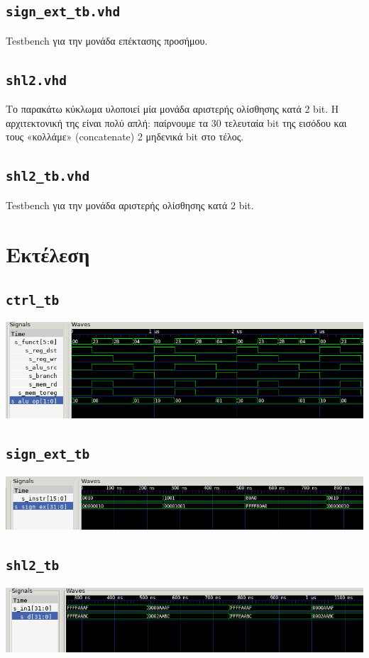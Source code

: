 \documentclass{article}
\begin{document}
\subsection{\lstinline{sign_ext_tb.vhd}}

Testbench για την μονάδα επέκτασης προσήμου. \\


\pagebreak

\subsection{\lstinline{shl2.vhd}}

Το παρακάτω κύκλωμα υλοποιεί μία μονάδα αριστερής ολίσθησης κατά 2 bit. Η
αρχιτεκτονική της είναι πολύ απλή: παίρνουμε τα 30 τελευταία bit της εισόδου
και τους «κολλάμε» (concatenate) 2 μηδενικά bit στο τέλος. \\


\pagebreak

\subsection{\lstinline{shl2_tb.vhd}}

Testbench για την μονάδα αριστερής ολίσθησης κατά 2 bit. \\


\pagebreak

\section{Εκτέλεση}

\subsection{\lstinline{ctrl_tb}}
\includegraphics[width=\textwidth]{res/ctrl.png}

\subsection{\lstinline{sign_ext_tb}}
\includegraphics[width=\textwidth]{res/sign_ext.png}

\subsection{\lstinline{shl2_tb}}
\includegraphics[width=\textwidth]{res/shl2.png}
\end{document}
